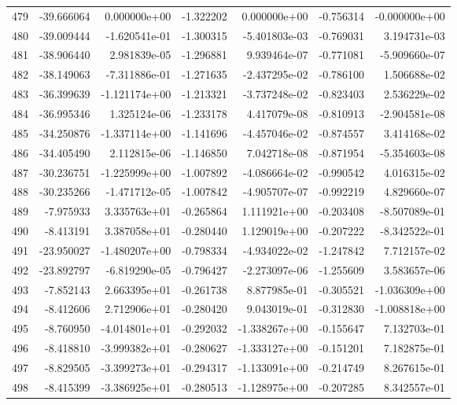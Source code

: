 \begin{tabular}{rrrrrrr}
 479 & -39.666064 &  0.000000e+00 & -1.322202 &  0.000000e+00 &  -0.756314 & -0.000000e+00 \\
 480 & -39.009444 & -1.620541e-01 & -1.300315 & -5.401803e-03 &  -0.769031 &  3.194731e-03 \\
 481 & -38.906440 &  2.981839e-05 & -1.296881 &  9.939464e-07 &  -0.771081 & -5.909660e-07 \\
 482 & -38.149063 & -7.311886e-01 & -1.271635 & -2.437295e-02 &  -0.786100 &  1.506688e-02 \\
 483 & -36.399639 & -1.121174e+00 & -1.213321 & -3.737248e-02 &  -0.823403 &  2.536229e-02 \\
 484 & -36.995346 &  1.325124e-06 & -1.233178 &  4.417079e-08 &  -0.810913 & -2.904581e-08 \\
 485 & -34.250876 & -1.337114e+00 & -1.141696 & -4.457046e-02 &  -0.874557 &  3.414168e-02 \\
 486 & -34.405490 &  2.112815e-06 & -1.146850 &  7.042718e-08 &  -0.871954 & -5.354603e-08 \\
 487 & -30.236751 & -1.225999e+00 & -1.007892 & -4.086664e-02 &  -0.990542 &  4.016315e-02 \\
 488 & -30.235266 & -1.471712e-05 & -1.007842 & -4.905707e-07 &  -0.992219 &  4.829660e-07 \\
 489 &  -7.975933 &  3.335763e+01 & -0.265864 &  1.111921e+00 &  -0.203408 & -8.507089e-01 \\
 490 &  -8.413191 &  3.387058e+01 & -0.280440 &  1.129019e+00 &  -0.207222 & -8.342522e-01 \\
 491 & -23.950027 & -1.480207e+00 & -0.798334 & -4.934022e-02 &  -1.247842 &  7.712157e-02 \\
 492 & -23.892797 & -6.819290e-05 & -0.796427 & -2.273097e-06 &  -1.255609 &  3.583657e-06 \\
 493 &  -7.852143 &  2.663395e+01 & -0.261738 &  8.877985e-01 &  -0.305521 & -1.036309e+00 \\
 494 &  -8.412606 &  2.712906e+01 & -0.280420 &  9.043019e-01 &  -0.312830 & -1.008818e+00 \\
 495 &  -8.760950 & -4.014801e+01 & -0.292032 & -1.338267e+00 &  -0.155647 &  7.132703e-01 \\
 496 &  -8.418810 & -3.999382e+01 & -0.280627 & -1.333127e+00 &  -0.151201 &  7.182875e-01 \\
 497 &  -8.829505 & -3.399273e+01 & -0.294317 & -1.133091e+00 &  -0.214749 &  8.267615e-01 \\
 498 &  -8.415399 & -3.386925e+01 & -0.280513 & -1.128975e+00 &  -0.207285 &  8.342557e-01 \\

\end{tabular}
